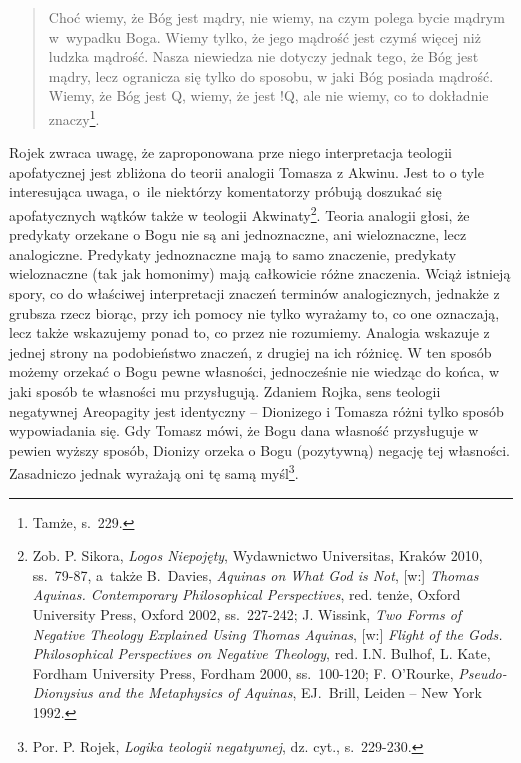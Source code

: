 \begin{quote}
    Choć wiemy, że Bóg jest mądry, nie wiemy, na czym polega bycie mądrym
    w~wypadku Boga. Wiemy tylko, że jego mądrość jest czymś więcej niż ludzka
mądrość. Nasza niewiedza nie dotyczy jednak tego, że Bóg jest mądry,
lecz ogranicza się tylko do sposobu, w jaki Bóg posiada mądrość. Wiemy,
że Bóg jest Q, wiemy, że jest !Q, ale nie wiemy, co to dokładnie
znaczy\footnote{Tamże, s.~229.}.
\end{quote}





Rojek zwraca uwagę, że zaproponowana prze niego interpretacja teologii
apofatycznej jest zbliżona do 
teorii analogii Tomasza z Akwinu. Jest to o tyle interesująca uwaga, o~ile niektórzy
komentatorzy próbują doszukać się apofatycznych wątków także w teologii
Akwinaty\footnote{Zob. P. Sikora, \textit{Logos Niepojęty}, Wydawnictwo Universitas, Kraków 2010, ss.~79-87,
a~także B.~Davies, \textit{Aquinas on What God is Not}, [w:]  \textit{Thomas
Aquinas. Contemporary Philosophical Perspectives}, red. tenże, Oxford University
Press, Oxford 2002, ss.~227-242; J. Wissink, \textit{Two Forms of Negative
Theology Explained Using Thomas Aquinas}, [w:]  \textit{Flight of the Gods. Philosophical Perspectives on Negative
Theology}, red. I.N. Bulhof, L.
Kate, Fordham University Press, Fordham 2000, ss.~100-120; F.
O'Rourke, \textit{Pseudo-Dionysius and the Metaphysics of
Aquinas}, EJ.~Brill, Leiden -- New York 1992. }. Teoria analogii
głosi, że predykaty orzekane o Bogu nie są ani jednoznaczne, ani
wieloznaczne, lecz analogiczne. Predykaty jednoznaczne mają to samo
znaczenie, predykaty wieloznaczne (tak jak homonimy) mają całkowicie
różne znaczenia. Wciąż istnieją spory, co do właściwej interpretacji
znaczeń terminów analogicznych, jednakże z grubsza  rzecz biorąc, przy
ich pomocy nie tylko wyrażamy to, co one oznaczają, lecz także
wskazujemy ponad to, co przez nie rozumiemy. Analogia wskazuje z jednej strony
na podobieństwo znaczeń, z drugiej na ich różnicę.
W ten sposób możemy
orzekać o Bogu pewne własności, jednocześnie nie wiedząc do końca, w
jaki sposób te własności mu przysługują. Zdaniem Rojka, sens teologii
negatywnej Areopagity jest identyczny -- Dionizego i Tomasza różni tylko
sposób wypowiadania się. Gdy Tomasz mówi, że Bogu dana własność
przysługuje w pewien wyższy sposób, Dionizy orzeka o Bogu (pozytywną)
negację tej własności. Zasadniczo jednak wyrażają oni tę samą
myśl\footnote{Por. P. Rojek, \textit{Logika teologii negatywnej}, dz. cyt., s.~229-230.}.



